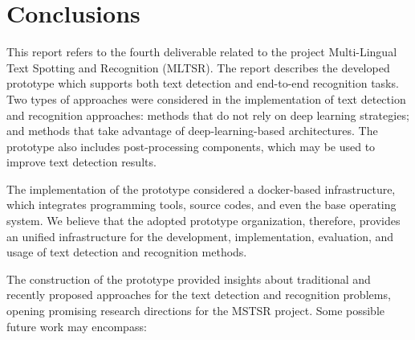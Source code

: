 \section{Conclusions}
\label{sec:conclusions}

This report refers to the fourth deliverable related to the project Multi-Lingual Text Spotting and Recognition (MLTSR). The report describes the developed prototype which supports both text detection and end-to-end recognition tasks. Two types of approaches were considered in the implementation of text detection and recognition approaches: methods that do not rely on deep learning strategies; and methods that take advantage of deep-learning-based architectures. The prototype also includes post-processing components, which may be used to improve text detection results. 

The implementation of the prototype considered a docker-based infrastructure, which integrates programming tools, source codes, and even the base operating system. We believe that the adopted prototype organization, therefore, provides an unified infrastructure for the development, implementation, evaluation, and usage of text detection and recognition methods.

The construction of the prototype provided insights about traditional and recently proposed approaches for the text detection and recognition problems, opening promising research directions for the MSTSR project.
Some possible future work may encompass:

